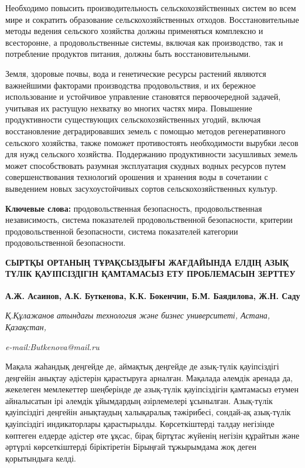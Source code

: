 Необходимо повысить производительность сельскохозяйственных систем во
всем мире и сократить образование сельскохозяйственных отходов.
Восстановительные методы ведения сельского хозяйства должны применяться
комплексно и всесторонне, а продовольственные системы, включая как
производство, так и потребление продуктов питания, должны быть
восстановительными.

Земля, здоровые почвы, вода и генетические ресурсы растений являются
важнейшими факторами производства продовольствия, и их бережное
использование и устойчивое управление становятся первоочередной задачей,
учитывая их растущую нехватку во многих частях мира. Повышение
продуктивности существующих сельскохозяйственных угодий, включая
восстановление деградировавших земель с помощью методов регенеративного
сельского хозяйства, также поможет противостоять необходимости вырубки
лесов для нужд сельского хозяйства. Поддержанию продуктивности
засушливых земель может способствовать разумная эксплуатация скудных
водных ресурсов путем совершенствования технологий орошения и хранения
воды в сочетании с выведением новых засухоустойчивых сортов
сельскохозяйственных культур.

{\bfseries Ключевые слова:} продовольственная безопасность,
продовольственная независимость, система показателей продовольственной
безопасности, критерии продовольственной безопасности, система
показателей категории продовольственной безопасности.

\begin{articleheader}
{\bfseries СЫРТҚЫ ОРТАНЫҢ ТҰРАҚСЫЗДЫҒЫ ЖАҒДАЙЫНДА ЕЛДІҢ АЗЫҚ ТҮЛІК ҚАУІПСІЗДІГІН ҚАМТАМАСЫЗ ЕТУ ПРОБЛЕМАСЫН ЗЕРТТЕУ}

{\bfseries
А.Ж. Асаинов,
А.К. Буткенова\textsuperscript{\envelope },
К.К. Бокенчин,
Б.М. Баядилова,
Ж.Н. Саду}
\end{articleheader}

\begin{affiliation}
\emph{Қ.Құлажанов атындағы технология және бизнес университеті, Астана, Қазақстан,}

\emph{e-mail:Butkenova@mail.ru}
\end{affiliation}

Мақала жаһандық деңгейде де, аймақтық деңгейде де азық-түлік
қауіпсіздігі деңгейін анықтау әдістерін қарастыруға арналған. Мақалада
әлемдік аренада да, жекелеген мемлекеттер шеңберінде де азық-түлік
қауіпсіздігін қамтамасыз етумен айналысатын ірі әлемдік ұйымдардың
әзірлемелері ұсынылған. Азық-түлік қауіпсіздігі деңгейін анықтаудың
халықаралық тәжірибесі, сондай-ақ азық-түлік қауіпсіздігі индикаторлары
қарастырылды. Көрсеткіштерді талдау негізінде көптеген елдерде әдістер
өте ұқсас, бірақ біртұтас жүйенің негізін құрайтын және әртүрлі
көрсеткіштерді біріктіретін Бірыңғай тұжырымдама жоқ деген қорытындыға
келді.

